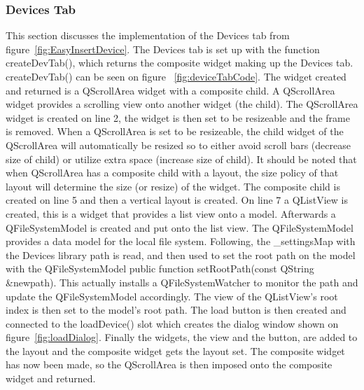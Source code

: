 \subsubsection{Devices Tab}
\label{sec:DeviceTab}
This section discusses the implementation of the Devices tab from figure~\ref{fig:EasyInsertDevice}. The Devices tab is set up with the function createDevTab(), which returns the composite widget making up the Devices tab. createDevTab() can be seen on figure ~\ref{fig:deviceTabCode}. The widget created and returned is a QScrollArea widget with a composite child. A QScrollArea widget provides a scrolling view onto another widget (the child). The QScrollArea widget is created on line 2, the widget is then set to be resizeable and the frame is removed. When a QScrollArea is set to be resizeable, the child widget of the QScrollArea will automatically be resized so to either avoid scroll bars (decrease size of child) or utilize extra space (increase size of child). It should be noted that when QScrollArea has a composite child with a layout, the size policy of that layout will determine the size (or resize) of the widget. The composite child is created on line 5 and then a vertical layout is created. On line 7 a QListView is created, this is a widget that provides a list view onto a model. Afterwards a QFileSystemModel is created and put onto the list view. The QFileSystemModel provides a data model for the local file system. Following, the \_settingsMap with the Devices library path is read, and then used to set the root path on the model with the QFileSystemModel public function setRootPath(const QString \&newpath). This actually installs a QFileSystemWatcher to monitor the path and update the QFileSystemModel accordingly. The view of the QListView's root index is then set to the model's root path. The load button is then created and connected to the loadDevice() slot which creates the dialog window shown on figure~\ref{fig:loadDialog}. Finally the widgets, the view and the button, are added to the layout and the composite widget gets the layout set. The composite widget has now been made, so the QScrollArea is then imposed onto the composite widget and returned. 


